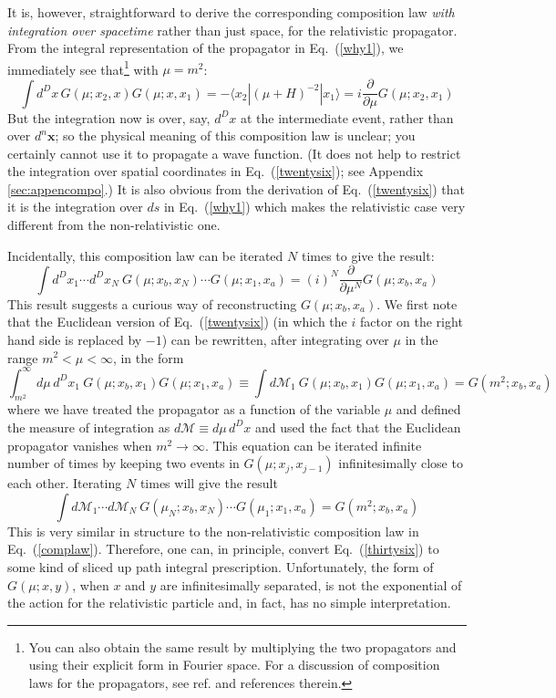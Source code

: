 \documentclass[12pt]{article}
\def\eq#1{{Eq.~(\ref{#1})}}
\def\bk#1#2#3{{\langle #1|#2|#3\rangle}}  %
\begin{document}
 It is, however, straightforward to derive the corresponding composition law \textit{with integration over spacetime} rather  than just space, for the relativistic propagator. 
 From the integral representation of the propagator in \eq{why1}, we immediately see that\footnote{You can also obtain the same result by multiplying the two propagators and using their explicit form in Fourier space. For a discussion of composition laws for the propagators, see ref. \cite{B,A1} and references therein.} with $\mu=m^2$:
\begin{equation}
 \int d^Dx \, G(\mu; x_2,x) G(\mu; x,x_1) = - \bk{x_2}{(\mu +H)^{-2}}{x_1} = i \frac{\partial}{\partial \mu} G(\mu; x_2,x_1)
 \label{twentysix}
\end{equation} 
But the integration now is over, say, $d^Dx$ at the intermediate event, rather than over $d^n\bm{x}$; so the physical meaning of this composition law is unclear; you certainly cannot use it to propagate a wave function. (It does not help to restrict the integration over spatial coordinates in \eq{twentysix}; see Appendix \ref{sec:appencompo}.) It is also obvious from the derivation of \eq{twentysix} that
  it is  the integration over $ds$ in \eq{why1}  which makes the relativistic case very different from the non-relativistic one. 
 
 Incidentally, this composition law can be  iterated $N$ times to give the result:
\begin{equation}
\int d^Dx_1 \cdots d^Dx_N\ G(\mu; x_b,x_N) \cdots G(\mu; x_1,x_a) = (i)^N  \frac{\partial}{\partial \mu^N} G(\mu; x_b,x_a)
\end{equation}
This result suggests a  curious way of reconstructing $G(\mu; x_b, x_a)$. We first note that the Euclidean version of \eq{twentysix} (in which the  $i$ factor on the right hand side is replaced by $-1$) can be rewritten, after integrating over $\mu$ in the range $m^2<\mu<\infty$, in the form 
 \begin{equation}
 \int_{m^2}^\infty d\mu\, d^Dx_1\ G(\mu; x_b, x_1) G(\mu; x_1,x_a)\equiv
 \int d\mathcal{M}_1\  G(\mu; x_b,x_1) G(\mu; x_1,x_a)   = G(m^2; x_b, x_a)
 \end{equation} 
 where we have treated the propagator as a function of the variable $\mu$ and defined the measure of integration as $d\mathcal{M} \equiv d\mu\, d^Dx$ and used the fact that the Euclidean propagator vanishes when $m^2\to\infty$. This equation can be iterated infinite number of times by keeping two events in $G(\mu; x_j,x_{j-1})$ infinitesimally
  close to each other.  Iterating $N$ times will give the result
  \begin{equation}
  \int d\mathcal{M}_1 \cdots d\mathcal{M}_N \ G(\mu_N; x_b,x_N) \cdots G(\mu_1; x_1,x_a) = G(m^2; x_b,x_a)
   \label{thirtysix}
  \end{equation} 
 This is very similar in structure to the non-relativistic composition law in \eq{complaw}. Therefore, one can, in principle, convert \eq{thirtysix} to some kind of sliced up path integral prescription. Unfortunately, the form of $G(\mu; x,y)$, when $x$ and $y$ are infinitesimally separated, is not the  exponential of the action for the relativistic particle and, in fact, has no simple interpretation.
\end{document}
